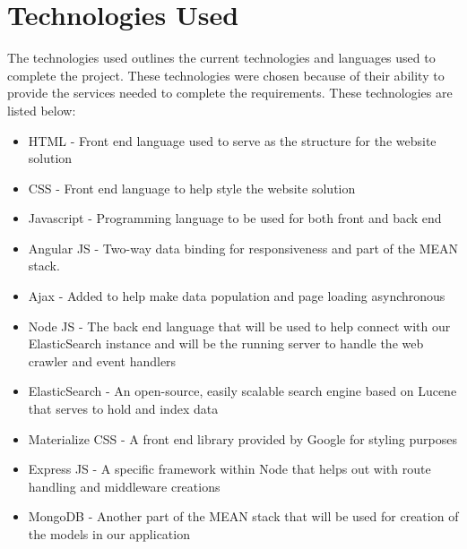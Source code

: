 \chapter{Technologies Used}
The technologies used outlines the current technologies and languages used to complete the project. These technologies were chosen because of their ability to provide the services needed to complete the requirements. These technologies are listed below:
	\begin{itemize}
		\item HTML - Front end language used to serve as the structure for the website solution
        \item CSS - Front end language to help style the website solution
		\item Javascript - Programming language to be used for both front and back end
		\item Angular JS - Two-way data binding for responsiveness and part of the MEAN stack. 
		\item Ajax - Added to help make data population and page loading asynchronous 
		\item Node JS - The back end language that will be used to help connect with our ElasticSearch instance and will be the running server to handle the web crawler and event handlers	
        \item ElasticSearch - An open-source, easily scalable search engine based on Lucene that serves to hold and index data
        \item Materialize CSS - A front end library provided by Google for styling purposes
		\item Express JS  - A specific framework within Node that helps out with route handling and middleware creations
        \item MongoDB - Another part of the MEAN stack that will be used for creation of the models in our application 
	\end{itemize}
